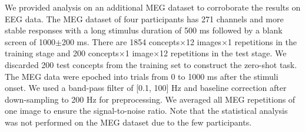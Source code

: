 We provided analysis on an additional MEG dataset \cite{hebart2023thingsdata} to corroborate the results on EEG data.
The MEG dataset of four participants has 271 channels and more stable responses with a long stimulus duration of 500 ms followed by a blank screen of 1000\(\pm\)200 ms.
There are 1854 concepts\(\times\)12 images\(\times\)1 repetitions in the training stage and 200 concepts\(\times\)1 image\(\times\)12 repetitions in the test stage.
We discarded 200 test concepts from the training set to construct the zero-shot task.
The MEG data were epoched into trials from 0 to 1000 ms after the stimuli onset.
We used a band-pass filter of [0.1, 100] Hz and baseline correction after down-sampling to 200 Hz for preprocessing.
We averaged all MEG repetitions of one image to ensure the signal-to-noise ratio.
Note that the statistical analysis was not performed on the MEG dataset due to the few participants.
\begin{table}[htpb]
\caption{Overall accuracy (\%) of 200-way zero-shot classification and retrieval on MEG data}
\label{tab:8}
\small
\centering
{}
\end{table}

